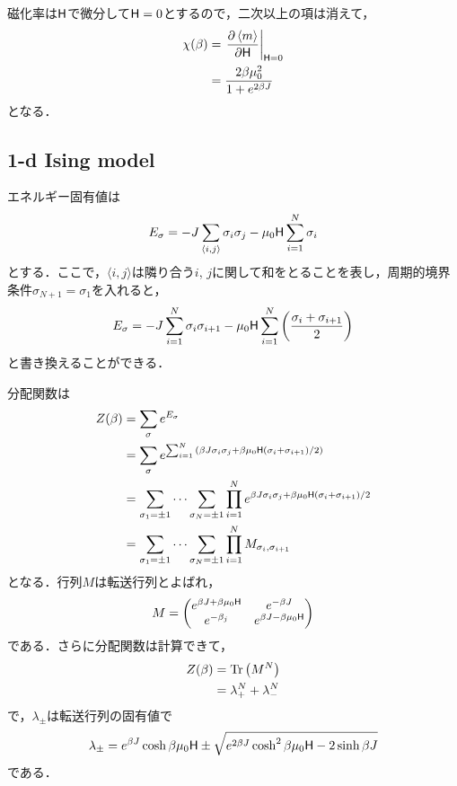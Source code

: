 	磁化率は$\mathsf{H}$で微分して$\mathsf{H} = 0$とするので，二次以上の項は消えて，
	\begin{align}
			\chi(\beta) &= \left.\pdv{\expval{m}}{\mathsf{H}}\right|_{\mathsf{H}=0}\\
					 &= \frac{2\beta\mu_0^2}{1 + e^{2\beta J}}
	\end{align}
	となる．

	\subsection{1-d Ising model}
	エネルギー固有値は
	\begin{equation}
			E_{\sigma} = -J\sum_{\langle i, j \rangle} \sigma_i\sigma_j - \mu_0\mathsf{H} \sum_{i=1}^{N}\sigma_i
	\end{equation}
	とする．ここで，$\langle i, j\rangle$は隣り合う$i$, $j$に関して和をとることを表し，周期的境界条件$\sigma_{N+1} = \sigma_1$を入れると，
	\begin{equation}
			E_{\sigma} = -J\sum_{i = 1}^{N}\sigma_{i}\sigma_{i+1} - \mu_0\mathsf{H}\sum_{i=1}^{N}\qty(\frac{\sigma_i+\sigma_{i+1}}{2})
	\end{equation}
	と書き換えることができる．

	分配関数は
	\begin{align}
			Z(\beta) &=\sum_{\sigma} e^{E_{\sigma}}\\
			 &= \sum_{\sigma}e^{\sum_{i=1}^{N}\qty(\beta J\sigma_i\sigma_j + \beta \mu_0\mathsf{H} (\sigma_i + \sigma_{i+1})/2)}\\
			 &= \sum_{\sigma_1 = \pm 1}\cdots\sum_{\sigma_N=\pm 1}\prod_{i=1}^{N}e^{\beta J\sigma_i\sigma_j + \beta \mu_0\mathsf{H} (\sigma_i + \sigma_{i+1})/2}\\
			 &= \sum_{\sigma_1 = \pm 1}\cdots\sum_{\sigma_N=\pm 1}\prod_{i=1}^{N}M_{\sigma_i, \sigma_{i+1}}
	\end{align}
	となる．行列$M$は転送行列とよばれ，
	\begin{equation}
			M = \begin{pmatrix}
					e^{\beta J + \beta\mu_0\mathsf{H}} & e^{-\beta J}\\
					e^{-\beta_j} & e^{\beta J - \beta \mu_0\mathsf{H}}
			\end{pmatrix}
	\end{equation}
	である．さらに分配関数は計算できて，
	\begin{align}
			Z(\beta) &= \Tr\qty(M^N)\\
					 &= \lambda_{+}^{N} + \lambda_{-}^{N}
	\end{align}
	で，$\lambda_{\pm}$は転送行列の固有値で
	\begin{equation}
			\lambda_{\pm} = e^{\beta J}\cosh\beta\mu_0\mathsf{H} \pm \sqrt{e^{2\beta J}\cosh^2\beta\mu_0\mathsf{H} - 2\sinh\beta J}
	\end{equation}
	である．

